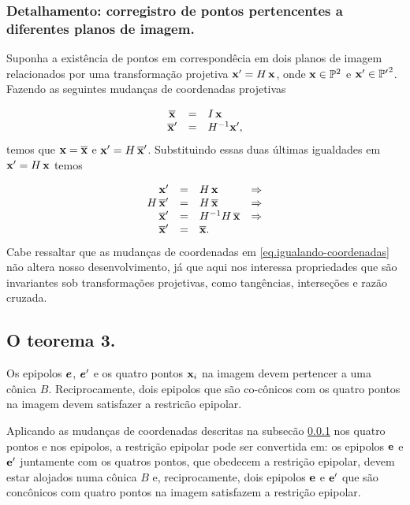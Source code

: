 \subsubsection{Detalhamento: corregistro de pontos pertencentes a diferentes planos de imagem.}\label{sec.corregistro-pontos}
Suponha a existência de pontos em correspondêcia em dois planos de imagem relacionados por uma transformação projetiva $\mathbf{x}'=H\,\mathbf{x}$, onde $\mathbf{x}\in {\mathbb{P}^2}$ e $\mathbf{x}'\in {\mathbb{P'}^2}$. Fazendo as seguintes mudanças de coordenadas projetivas

\begin{equation}\label{eq.igualando-coordenadas}
\begin{array}{rcl}
\overline{\mathbf{x}}\,&=&I\,\mathbf{x}\\
\overline{\mathbf{x}}'&=&H^{-1}\mathbf{x}',
\end{array}
\end{equation}
temos que $\mathbf{x}=\overline{\mathbf{x}}$ e $\mathbf{x}'=H\,\overline{\mathbf{x}}'$. Substituindo essas duas últimas igualdades em $\mathbf{x}'=H\,\mathbf{x}$ temos

\begin{equation*}
\begin{array}{rcll}
\mathbf{x}'&=&H\,\mathbf{x}&\Rightarrow\\
H\,\overline{\mathbf{x}}'&=&H\,\overline{\mathbf{x}}&\Rightarrow\\
\overline{\mathbf{x}}'&=&H^{-1}H\,\overline{\mathbf{x}}&\Rightarrow\\
\overline{\mathbf{x}}'&=&\overline{\mathbf{x}}.&
\end{array}
\end{equation*}
Cabe ressaltar que as mudanças de coordenadas em \ref{eq.igualando-coordenadas} não altera nosso desenvolvimento, já que aqui nos interessa propriedades que são invariantes sob transformações projetivas, como tangências, interseções e raz\~ao cruzada.

\subsection{O teorema 3.}\label{sec.teorema-3}

\begin{teorema}
Os epipolos $\boldsymbol{e}$, $\boldsymbol{e}'$ e os quatro pontos $\mathbf{x}_i$ na imagem devem pertencer a uma cônica $B$. Reciprocamente, dois epipolos que são co-cônicos com os quatro pontos na imagem devem satisfazer a restricão epipolar.
\end{teorema}

Aplicando as mudanças de coordenadas descritas na subsec\~ao \ref{sec.corregistro-pontos} nos quatro pontos e nos epipolos, a restrição epipolar pode ser convertida em: os epipolos ${\bf e}$ e ${\bf e'}$ juntamente com os quatros pontos, que obedecem a restrição epipolar, devem estar alojados numa cônica $B$ e, reciprocamente, dois epipolos ${\bf e}$ e ${\bf e'}$ que são concônicos com quatro pontos na imagem satisfazem a restrição epipolar. 

